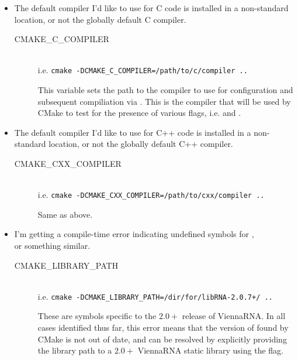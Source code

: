 \documentclass[11pt]{article}
\begin{document}
\begin{itemize}
  \item The default compiler I'd like to use for C code is installed in a non-standard location, or not the globally default C compiler.
  \begin{description}
    \item[CMAKE\_C\_COMPILER] \hfill \\
      i.e. {\tt cmake -DCMAKE\_C\_COMPILER=/path/to/c/compiler ..} \hfill \\
      \begin{spacing}{.5}
      \end{spacing}
        This variable sets the path to the compiler to use for configuration and subsequent compiliation via . This is the compiler that will be used by CMake to test for the presence of various flags, i.e.  and .
  \end{description}

  \item The default compiler I'd like to use for C++ code is installed in a non-standard location, or not the globally default C++ compiler.
  \begin{description}
    \item[CMAKE\_CXX\_COMPILER] \hfill \\
      i.e. {\tt cmake -DCMAKE\_CXX\_COMPILER=/path/to/cxx/compiler ..} \hfill \\
      \begin{spacing}{.5}
      \end{spacing}
        Same as above.
  \end{description}

  \item I'm getting a compile-time error indicating undefined symbols for , \\  or something similar.
  \begin{description}
    \item[CMAKE\_LIBRARY\_PATH] \hfill \\
      i.e. {\tt cmake -DCMAKE\_LIBRARY\_PATH=/dir/for/libRNA-2.0.7+/ ..} \hfill \\
      \begin{spacing}{.5}
      \end{spacing}
        These are  symbols specific to the $2.0+$ release of ViennaRNA. In all cases identified thus far, this error means that the version of  found by CMake is not out of date, and can be resolved by explicitly providing the library path to a $2.0+$ ViennaRNA static library using the  flag.
  \end{description}


\end{itemize}
\end{document}
